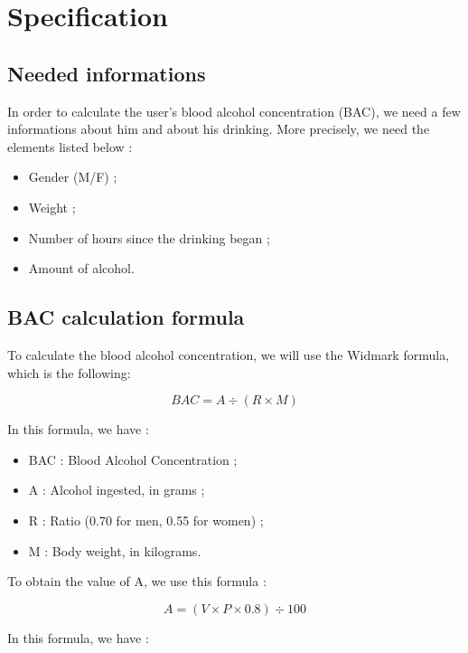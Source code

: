 \section{Specification}
\label{sec:spec}

\subsection{Needed informations}
\label{ssec:info} 

In order to calculate the user's blood alcohol concentration (BAC), we need a few informations about him and about his drinking. More precisely, we need the elements listed below :

\begin{itemize}
\item Gender (M/F) ;
\item Weight ;
\item Number of hours since the drinking began ; 
\item Amount of alcohol.
\end{itemize}

\subsection{BAC calculation formula}
\label{ssec:formula}

To calculate the blood alcohol concentration, we will use the Widmark formula, which is the following:

\begin{equation}
   BAC = A \div (R \times M)
\end{equation}
   
In this formula, we have :

\begin{itemize} 
\item BAC : Blood Alcohol Concentration ;
\item A : Alcohol ingested, in grams ;
\item R : Ratio (0.70 for men, 0.55 for women) ;
\item M : Body weight, in kilograms.
\end{itemize}

To obtain the value of A, we use this formula :

\begin{equation}
   A = (V \times P \times 0.8) \div 100
\end{equation}

In this formula, we have :

